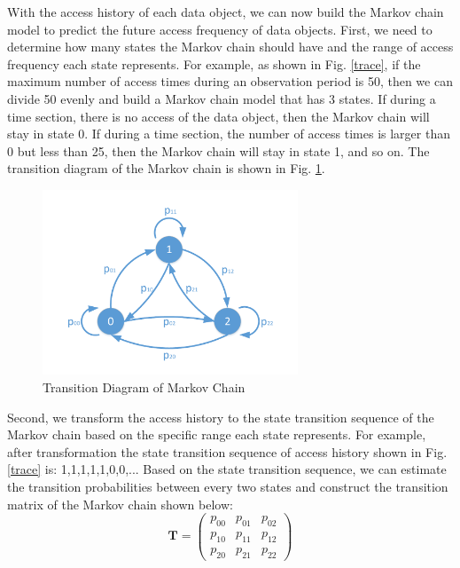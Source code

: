 With the access history of each data object, we can now build the Markov chain model to predict the future access frequency of data objects. First, we need to determine how many states the Markov chain should have and the range of access frequency each state represents. For example, as shown in Fig. \ref{trace}, if the maximum number of access times during an observation period is 50, then we can divide 50 evenly and build a Markov chain model that has 3 states. If during a time section, there is no access of the data object, then the Markov chain will stay in state 0. If during a time section, the number of access times is larger than 0 but less than 25, then the Markov chain will stay in state 1, and so on. The transition diagram of the Markov chain is shown in Fig. \ref{transitioin}.

\begin{figure}[!t]
\centering
\includegraphics[width=3.0in]{./transition.pdf}
\caption{Transition Diagram of Markov Chain}
\vspace{-0.25in}
\label{transitioin}
\end{figure}

Second, we transform the access history to the state transition sequence of the Markov chain based on the specific range each state represents. For example, after transformation the state transition sequence of access history shown in Fig. \ref{trace} is: 1,1,1,1,1,0,0,... Based on the state transition sequence, we can estimate the transition probabilities between every two states and construct the transition matrix of the Markov chain shown below:
\begin{equation}
\mathbf{T} =
 \begin{pmatrix}
  p_{00} & p_{01} & p_{02} \\
  p_{10} & p_{11} & p_{12} \\
  p_{20} & p_{21} & p_{22}
 \end{pmatrix}
\end{equation}

